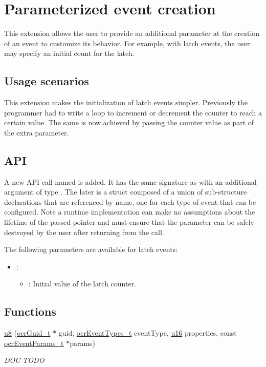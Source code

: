 \section{Parameterized event creation}
\label{sec:paramEvents}
This extension allows the user to provide an additional parameter at
the creation of an event to customize its behavior. For example, with
latch events, the user may specify an initial count for the latch.

\subsection{Usage scenarios}
This extension makes the initialization of latch events
simpler. Previously the programmer had to write a loop to increment or
decrement the counter to reach a certain value. The same is now
achieved by passing the counter value as part of the extra parameter.

\subsection{API}
A new API call named
\hyperlink{func_ocrEventCreateParams}{}
is added. It has the same signature as
\hyperlink{func_ocrEventCreate}{} with an
additional argument of type . The later is
a struct composed of a union of sub-structure declarations that are
referenced by name, one for each type of event that can be
configured. Note a runtime implementation can make no assumptions
about the lifetime of the passed pointer and must ensure that the
parameter can be safely destroyed by the user after returning from the call.

The following parameters are available for latch events:
\begin{itemize}
\item {}:
\begin{itemize}
\item {}: Initial value of the latch counter.
\end{itemize}
\end{itemize}

\subsection*{Functions}
\begin{DoxyCompactItemize}
\item
\hyperlink{type_u8}{u8} \hyperlink{func_ocrGuidMapCreate}
{}(\hyperlink{type_ocrGuid_t}{ocr\-Guid\-\_\-t}
$\ast$ guid,
\hyperlink{type_ocrEventTypes_t}{ocrEventTypes\_t} eventType,
\hyperlink{type_u16}{u16} properties,
const \hyperlink{type_ocrEventParams_t}{ocrEventParams\_t} $\ast$params)
\begin{DoxyCompactList}
  \small \item \emph{DOC TODO}
\end{DoxyCompactList}
\end{DoxyCompactItemize}

